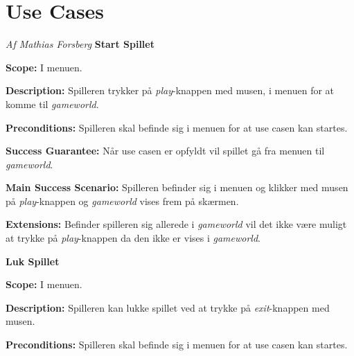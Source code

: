 \section{Use Cases}
\textit{Af Mathias Forsberg}\newline
\textbf{Start Spillet}\newline

\textbf{Scope:}\newline
I menuen.\newline

\textbf{Description:} \newline
Spilleren trykker på \textit{play}-knappen med musen, i menuen for at komme til \textit{gameworld}. \newline

\textbf{Preconditions:}\newline
Spilleren skal befinde sig i menuen for at use casen kan startes.\newline

\textbf{Success Guarantee:}\newline
Når use casen er opfyldt vil spillet gå fra menuen til \textit{gameworld}.\newline

\textbf{Main Success Scenario:}\newline
Spilleren befinder sig i menuen og klikker med musen på \textit{play}-knappen og \textit{gameworld} vises frem på skærmen.\newline

\textbf{Extensions:}\newline
Befinder spilleren sig allerede i \textit{gameworld} vil det ikke være muligt at trykke på \textit{play}-knappen da den ikke er vises i \textit{gameworld}.\newline \newline



\textbf{Luk Spillet}\newline

\textbf{Scope:}\newline
I menuen. \newline

\textbf{Description:} \newline
Spilleren kan lukke spillet ved at trykke på \textit{exit}-knappen med musen.\newline

\textbf{Preconditions:}\newline
Spilleren skal befinde sig i menuen for at use casen kan startes.\newline

